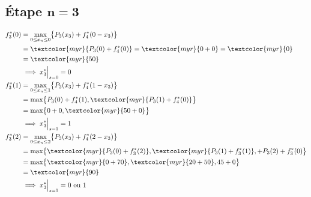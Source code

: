 \documentclass{report}
\begin{document}
\begin{multicols*}{2}

\end{multicols*}



\begin{flushleft}
\subsection{Étape $\boldsymbol{n= 3}$}
\begin{align*}
    f_3^{*}(0)  &= \max_{0 \leq x_n \leq 0} \bigl\{ P_3(x_3) + f_4^{*}(0 - x_3) \bigr\}
    \\ 
               &= \textcolor{myr}{P_3(0) + f_4^{*}(0)} = \textcolor{myr}{0 + 0} = \textcolor{myr}{0} 
    \\          
               &=\textcolor{myr}{50} 
    \\
               &\implies x_3^{*}\Big|_{s = 0} = 0
    \\
    f_3^{*}(1)  &= \max_{0 \leq x_n \leq 1} \bigl\{ P_3(x_3) + f_4^{*}(1 - x_3) \bigr\} 
    \\ 
               &=\max \bigl\{ P_3(0) + f_4^{*}(1), \textcolor{myr}{P_3(1) + f_4^{*}(0)}  \bigr\}
               \\
               &=\max\bigl\{0 + 0, \textcolor{myr}{50 + 0}\bigr\} 
               \\ 
               &\implies x_3^{*}\Big|_{s = 1} = 1
    \\
    f_3^{*}(2)  &= \max_{0 \leq x_n \leq 2} \bigl\{ P_3(x_3) + f_4^{*}(2 - x_3) \bigr\} 
    \\ 
               &= \max\bigl\{ \textcolor{myr}{P_3(0) + f_3^{*}(2)}, 
                       \textcolor{myr}{P_3(1) + f_3^{*}(1)}, + P_3(2) + f_3^{*}(0)  \bigr\} 
    \\
               &=\max\bigl\{\textcolor{myr}{0 + 70}, \textcolor{myr}{20 + 50}, 45 + 0 \bigr\} 
               \\ 
               &= \textcolor{myr}{90}
               \\
               &\implies x_3^{*}\Big|_{s = 1} = 0 \text{ ou } 1
\end{align*}                





\end{flushleft}
\end{document}
